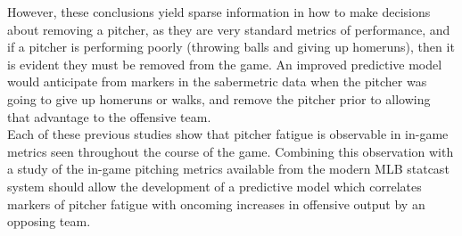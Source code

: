 \documentclass[12 pt]{article}
\begin{document}
However, these conclusions yield sparse information in how to make decisions about removing a pitcher, 
as they are very standard metrics of performance, and if a pitcher is performing poorly 
(throwing balls and giving up homeruns), then it is evident they must be removed 
from the game. An improved predictive model would anticipate from markers in the sabermetric 
data when the pitcher was going to give up homeruns or walks, and remove the pitcher prior to allowing 
that advantage to the offensive team.
\\ \indent Each of these previous studies show that pitcher fatigue is observable in 
in-game metrics seen throughout the course of the game. Combining this observation with a 
study of the in-game pitching metrics available from the modern MLB statcast system should 
allow the development of a predictive model which correlates markers of pitcher fatigue with 
oncoming increases in offensive output by an opposing team. \\
\end{document}
